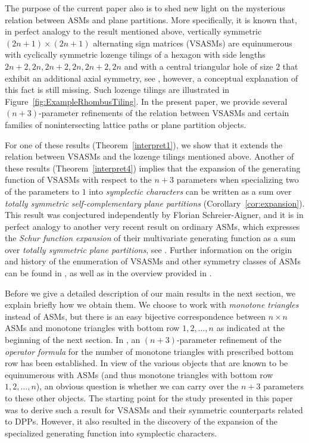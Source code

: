\documentclass[12pt]{amsart}
\theoremstyle{definition}
\numberwithin{equation}{section}
\begin{document}
The purpose of the current paper also is to shed new light on the mysterious relation between ASMs and plane partitions. More specifically, it is known that, in perfect analogy to the result mentioned above, vertically symmetric $(2n+1) \times (2n+1)$ alternating sign matrices (VSASMs) are equinumerous with cyclically symmetric lozenge tilings of a hexagon with side lengths $2n+2,2n,2n+2,2n,2n+2,2n$ and with a central triangular hole of size $2$ that exhibit an additional axial symmetry, see \cite{MRR87,Kup94}, however, a conceptual explanation of this fact is still missing. Such lozenge tilings are illustrated in Figure~\ref{fig:ExampleRhombusTiling}. In the present paper, we provide  several $(n+3)$-parameter refinements of the relation between VSASMs and certain families of nonintersecting lattice paths or plane partition objects. 


For one of these results (Theorem~\ref{interpret1}), we show that it extends the relation between VSASMs and the lozenge tilings mentioned above. Another of these results (Theorem~\ref{interpret4}) implies that the expansion of the generating function of VSASMs with respect to the $n+3$ parameters when specializing two of the parameters to $1$ into \emph{symplectic characters} can be written as a sum over \emph{totally symmetric self-complementary plane partitions} (Corollary~\ref{cor:expansion}). This result was conjectured independently by Florian Schreier-Aigner, and it is in perfect analogy to another very recent result on ordinary 
ASMs, which expresses the \emph{Schur function expansion} of their multivariate generating function as a sum over \emph{totally symmetric plane partitions}, see \cite{TSPP}.
Further information on the origin and history of the enumeration of VSASMs and other symmetry classes of ASMs can be found in \cite{Rob91,Rob00,Kup02}, as well as in the overview provided in \cite{BehFisKon17}.

Before we give a detailed description of our main results in the next section, we explain briefly how we obtain them. We choose to work with \emph{monotone triangles} instead of ASMs, but there is 
an easy bijective correspondence between $n \times n$ ASMs and monotone triangles with bottom row $1,2,\ldots,n$ as indicated at the beginning of the next section. In \cite{nASMDPP}, an $(n+3)$-parameter refinement of the \emph{operator formula} \cite{Fis06} 
for the number of monotone triangles with prescribed bottom row has been established. In view of the various objects that are known to be equinumerous with ASMs (and thus monotone triangles with bottom row 
$1,2,\ldots,n$), an obvious question is whether we can carry over the $n+3$ parameters to these other objects. The starting point for the study presented in this paper 
was to derive such a result for VSASMs and their symmetric counterparts related to DPPs. However, it also resulted in the discovery of the expansion of the specialized generating function into symplectic characters. 
\end{document}
